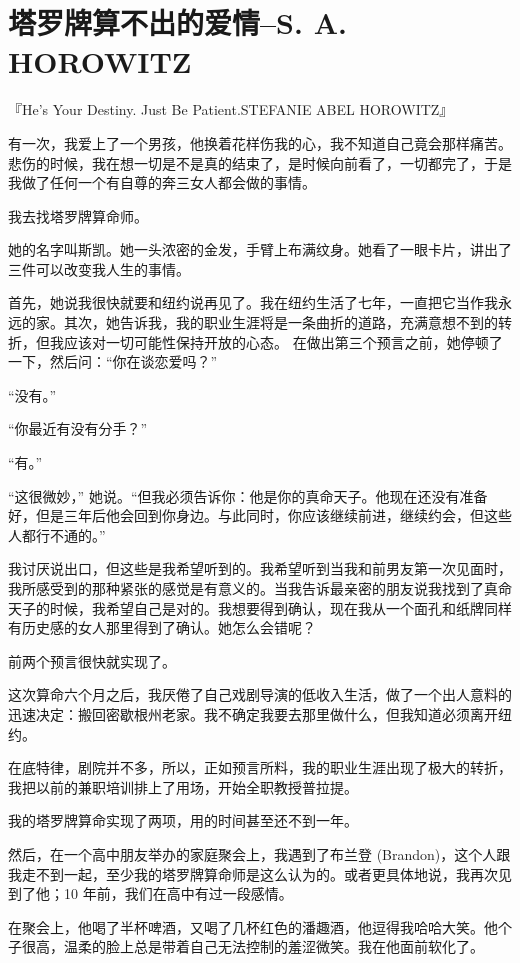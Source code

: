\section{ 塔罗牌算不出的爱情--S. A. HOROWITZ}
『He’s Your Destiny. Just Be Patient.STEFANIE ABEL HOROWITZ』


有一次，我爱上了一个男孩，他换着花样伤我的心，我不知道自己竟会那样痛苦。悲伤的时候，我在想一切是不是真的结束了，是时候向前看了，一切都完了，于是我做了任何一个有自尊的奔三女人都会做的事情。


我去找塔罗牌算命师。


她的名字叫斯凯。她一头浓密的金发，手臂上布满纹身。她看了一眼卡片，讲出了三件可以改变我人生的事情。


首先，她说我很快就要和纽约说再见了。我在纽约生活了七年，一直把它当作我永远的家。其次，她告诉我，我的职业生涯将是一条曲折的道路，充满意想不到的转折，但我应该对一切可能性保持开放的心态。
在做出第三个预言之前，她停顿了一下，然后问：“你在谈恋爱吗？”


“没有。”


“你最近有没有分手？”


“有。”


“这很微妙，” 她说。“但我必须告诉你：他是你的真命天子。他现在还没有准备好，但是三年后他会回到你身边。与此同时，你应该继续前进，继续约会，但这些人都行不通的。”


我讨厌说出口，但这些是我希望听到的。我希望听到当我和前男友第一次见面时，我所感受到的那种紧张的感觉是有意义的。当我告诉最亲密的朋友说我找到了真命天子的时候，我希望自己是对的。我想要得到确认，现在我从一个面孔和纸牌同样有历史感的女人那里得到了确认。她怎么会错呢？


前两个预言很快就实现了。


这次算命六个月之后，我厌倦了自己戏剧导演的低收入生活，做了一个出人意料的迅速决定：搬回密歇根州老家。我不确定我要去那里做什么，但我知道必须离开纽约。


在底特律，剧院并不多，所以，正如预言所料，我的职业生涯出现了极大的转折，我把以前的兼职培训排上了用场，开始全职教授普拉提。


我的塔罗牌算命实现了两项，用的时间甚至还不到一年。


然后，在一个高中朋友举办的家庭聚会上，我遇到了布兰登 (Brandon)，这个人跟我走不到一起，至少我的塔罗牌算命师是这么认为的。或者更具体地说，我再次见到了他；10 年前，我们在高中有过一段感情。


在聚会上，他喝了半杯啤酒，又喝了几杯红色的潘趣酒，他逗得我哈哈大笑。他个子很高，温柔的脸上总是带着自己无法控制的羞涩微笑。我在他面前软化了。


